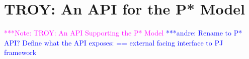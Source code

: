 \documentclass[conference,final]{IEEEtran}
\makeatletter
\def\reduwave{\bgroup \markoverwith{\lower3.5\p@\hbox{\sixly \textcolor{red}{\char58}}}\ULon}
\newcommand{\terminology}[1]{ {\textcolor{red} {(Terminology used: \textbf{#1}) }}}
\newcommand{\jwave}[1]{ {\reduwave{#1}}}
\newcommand{\jhanote}[1]{ {\textcolor{red} { ***shantenu: #1 }}}
\newcommand{\alnote}[1]{ {\textcolor{blue} { ***andre: #1 }}}
\newcommand{\msnote}[1]{ {\textcolor{cyan} { ***mark: #1 }}}
\newcommand{\note}[1]{ {\textcolor{magenta} { ***Note: #1 }}}
\newcommand{\terminology}[1]{}
\newcommand{\jwave}[1]{#1}
\newcommand{\alnote}[1]{}
\newcommand{\jhanote}[1]{}
\newcommand{\msnote}[1]{}
\newcommand{\note}[1]{}
\newcommand{\cu}{CU\xspace}
\newcommand{\upp}{\vspace*{-0.5em}}
\makeatother
\begin{document}


 



\section{TROY: An API for the P*  Model\upp\upp}
\note{TROY: An API Supporting the P* Model}
\alnote{Rename to P* API? Define what the API exposes: == external facing
interface to PJ framework}




\end{document}
